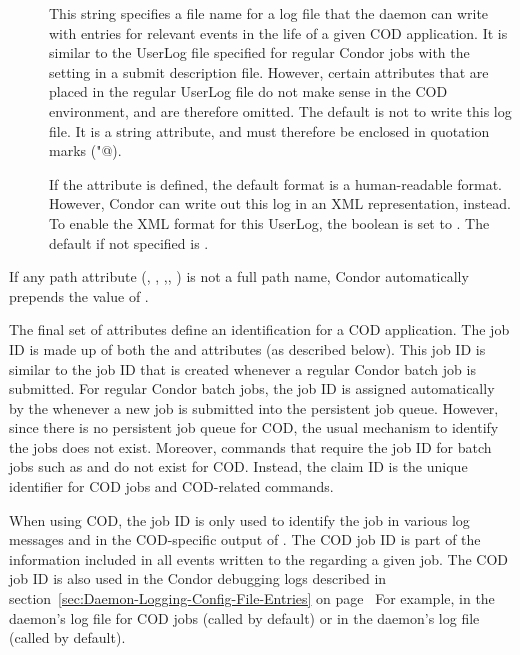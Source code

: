 \begin{description}
 \item[] This string specifies a file name for a
   log file that the  daemon can write with entries
   for relevant 
   events in the life of a given COD application.
   It is similar to the UserLog file specified for regular Condor
   jobs with the  setting in a submit description
   file.
   However, certain attributes that are placed in the regular UserLog
   file do not make sense in the COD environment, and are therefore
   omitted.
   The default is not to write this log file.
   It is a string attribute, and must therefore be enclosed in 
   quotation marks (\verb@"@).

 \item[] If the 
   attribute is defined, the default format is a
   human-readable format.
   However, Condor can write out this log in an XML representation,
   instead.
   To enable the XML format for this UserLog, the
    boolean is set to \verb@TRUE@.
   The default if not specified is \verb@FALSE@.

\end{description}

\Note If any path attribute (, ,
,, ) is not a full path name,
Condor automatically prepends the value of .



The final set of attributes define an identification for a COD application.
The job ID is made up of both the  and 
attributes (as described below).
This job ID is similar to the job ID that is created whenever a
regular Condor batch job is submitted.
For regular Condor batch jobs, the job ID is assigned automatically by
the  whenever a new job is submitted into the
persistent job queue.
However, since there is no persistent job queue for COD, the usual
mechanism to identify the jobs does not exist.
Moreover, commands that require the job ID for batch jobs such as
 and  do not exist for COD.
Instead, the claim ID is the unique identifier for COD jobs and
COD-related commands.

When using COD, the job ID is only used to identify the job in various
log messages and in the COD-specific output of .
The COD job ID is part of the information included in all
events written to the 
regarding a given job.
The COD job ID is also used in the Condor debugging logs described in
section~\ref{sec:Daemon-Logging-Config-File-Entries} on
page~\pageref{sec:Daemon-Logging-Config-File-Entries}
For example, in the  daemon's log file for COD jobs
(called  by default) or in the 
daemon's log
file (called  by default).

